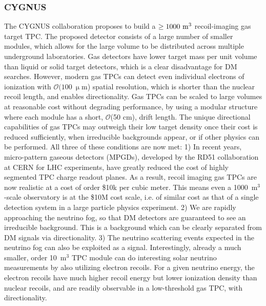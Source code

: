 \subsubsection{CYGNUS}
 
The CYGNUS collaboration proposes to build a $\ge 1000~{\rm m}^3$ recoil-imaging gas target TPC. The proposed detector consists of a large number of smaller modules, which allows for the large volume to be distributed across multiple underground laboratories. Gas detectors have lower target mass per unit volume than liquid or solid target detectors, which is a clear disadvantage for DM searches. However, modern gas TPCs can detect even individual electrons of ionization with $\mathcal{O}(100~\upmu$m) spatial resolution, which is shorter than the nuclear recoil length, and enables directionality. Gas TPCs can be scaled to large volumes at reasonable cost without degrading performance, by using a modular structure where each module has a short, $\mathcal{O}$(50 cm), drift length. The unique directional capabilities of gas TPCs may outweigh their low target density once their cost is reduced sufficiently, when irreducible backgrounds appear, or if other physics can be performed. All three of these conditions are now met: 1) In recent years, micro-pattern gaseous detectors (MPGDs), developed by the RD51 collaboration at CERN for LHC experiments, have greatly reduced the cost of highly segmented TPC charge readout planes. As a result, recoil imaging gas TPCs are now realistic at a cost of order \$10k per cubic meter. This means even a 1000~m$^3$-scale observatory is at the \$10M cost scale, i.e. of similar cost as that of a single detection system in a large particle physics experiment. 2) We are rapidly approaching the neutrino fog, so that DM detectors are guaranteed to see an irreducible background. This is a background which can be clearly separated from DM signals via directionality. 3) The neutrino scattering events expected in the neutrino fog can also be exploited as a signal. Interestingly, already a much smaller, order 10~m$^3$ TPC module can do interesting solar neutrino measurements by also utilizing electron recoils. For a given neutrino energy, the electron recoils have much higher recoil energy but lower ionization density than nuclear recoils, and are readily observable in a low-threshold gas TPC, with directionality.

